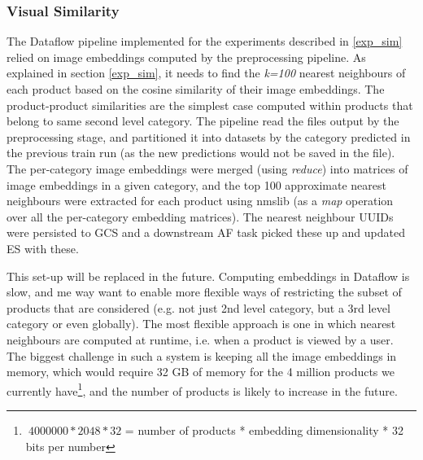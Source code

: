 \subsubsection{Visual Similarity}
\label{vis_sim_pp}

The Dataflow pipeline implemented for the experiments described in \ref{exp_sim} relied on image embeddings computed by the preprocessing pipeline.
As explained in section \ref{exp_sim}, it needs to find the \textit{k=100} nearest neighbours of each product based on the cosine similarity of their image embeddings.
The product-product  similarities are the simplest case computed within products that belong to same second level category.
The pipeline read the files output by the preprocessing stage, and partitioned it into datasets by the category predicted in the previous train run (as the new predictions would not be saved in the file).
The per-category image embeddings were merged (using \textit{reduce}) into matrices of image embeddings in a given category, and the top 100 approximate nearest neighbours were extracted for each product using nmslib \cite{nmslib} (as a \textit{map} operation over all the per-category embedding matrices).
The nearest neighbour UUIDs were persisted to GCS and a downstream AF task picked these up and updated ES with these.

This set-up will be replaced in the future.
Computing embeddings in Dataflow is slow, and me way want to enable more flexible ways of restricting the subset of products that are considered (e.g. not just 2nd level category, but a 3rd level category or even globally).
The most flexible approach is one in which nearest neighbours are computed at runtime, i.e. when a product is viewed by a user.
The biggest challenge in such a system is keeping all the image embeddings in memory, which would require 32 GB of memory for the 4 million products we currently have\footnote{$~4000000 * 2048 * 32$ = number of products * embedding dimensionality * 32 bits per number}, and the number of products is likely to increase in the future.

